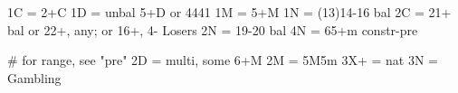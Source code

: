 1C = 2+C
1D = unbal 5+D or 4441
1M = 5+M
1N = (13)14-16 bal
2C = 21+ bal or 22+, any; or 16+, 4- Losers
2N = 19-20 bal
4N = 65+m constr-pre

# for range, see "pre"
2D = multi, some 6+M
2M = 5M5m
3X+ = nat
3N = Gambling